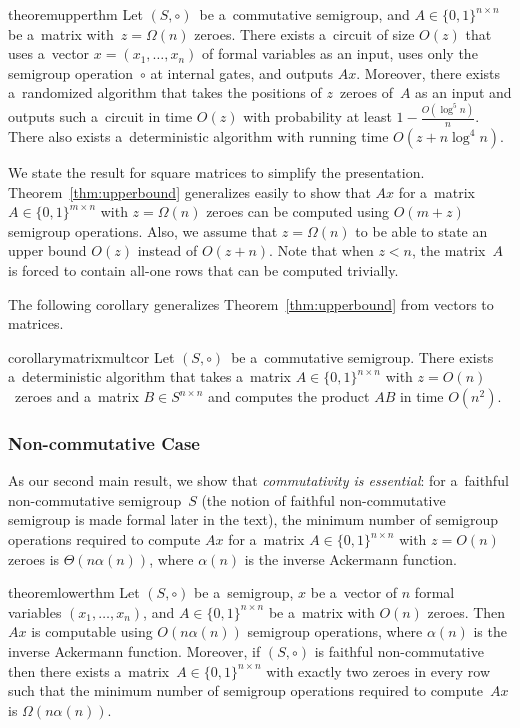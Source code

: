 \documentclass[review,onefignum,onetabnum]{siamart190516}
\begin{document}
\begin{restatable}{theorem}{upperthm}
\label{thm:upperbound}
Let $(S, \circ)$~be a~commutative semigroup,
and $A \in \{0,1\}^{n \times n}$ be a~matrix
with~$z=\Omega(n)$ zeroes.
There exists a~circuit of size $O(z)$ that uses
a~vector $x = (x_1,\ldots, x_n)$ of formal variables as an input,
uses only the semigroup operation~$\circ$ at internal gates,
and outputs $Ax$. Moreover, there exists a~randomized
algorithm that takes the positions of $z$~zeroes of~$A$
as an input and outputs such a~circuit in time $O(z)$
with probability at least $1-\frac{O(\log^5n)}{n}$. There also
exists a~deterministic algorithm with running time $O(z+n\log^4n)$.
\end{restatable}

We state the result for square matrices to simplify the presentation.
Theorem~\ref{thm:upperbound} generalizes easily to show that $Ax$ for a~matrix
$A \in \{0,1\}^{m \times n}$ with $z=\Omega(n)$ zeroes can be computed using
$O(m+z)$ semigroup operations. Also, we assume that $z=\Omega(n)$ to be able to
state an upper bound $O(z)$ instead of $O(z+n)$. Note that when $z<n$, the
matrix~$A$ is forced to contain all-one rows that can be computed trivially.

The following corollary generalizes Theorem~\ref{thm:upperbound}
from vectors to matrices.

\begin{restatable}{corollary}{matrixmultcor}
\label{cor:matrixmultiplication}
Let $(S, \circ)$~be a~commutative semigroup.
There exists a~deterministic algorithm that takes
a~matrix $A \in \{0,1\}^{n \times n}$ with
$z=O(n)$~zeroes
and a~matrix $B \in S^{n \times n}$ and computes
the product $AB$ in time $O(n^2)$.
\end{restatable}

\subsubsection{Non-commutative Case}
As our second main result, we show that \emph{commutativity is essential}: for
a~faithful non-commutative semigroup~$S$
(the notion of faithful non-commutative semigroup  is made formal
later in the text), the minimum number of semigroup operations
required to compute $Ax$ for a~matrix
$A \in \{0,1\}^{n \times n}$ with $z=O(n)$ zeroes is
$\Theta(n\alpha(n))$, where $\alpha(n)$ is the inverse Ackermann function.

\begin{restatable}{theorem}{lowerthm}
\label{thm:lowerbound}
Let $(S, \circ)$ be a~semigroup, $x$ be
a~vector of $n$ formal variables $(x_1,\ldots, x_n)$, and
$A \in \{0,1\}^{n \times n}$ be a~matrix with $O(n)$ zeroes. Then $Ax$ is
computable using $O(n\alpha(n))$ semigroup operations, where $\alpha(n)$
is the inverse Ackermann function. Moreover, if $(S, \circ)$ is faithful non-commutative then there exists
a~matrix~$A \in \{0,1\}^{n \times n}$ with exactly two zeroes
in every row such that the minimum number of semigroup
operations
required to compute~$Ax$ is $\Omega(n\alpha(n))$.
\end{restatable}
\end{document}
